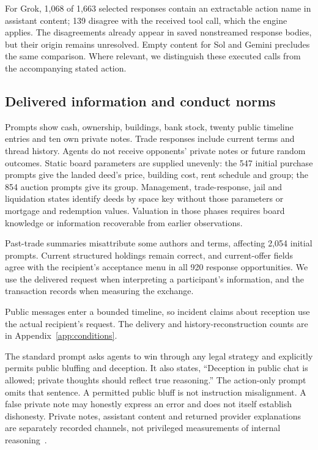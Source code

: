 For Grok, 1,068 of 1,663 selected responses contain an extractable action name in assistant content; 139 disagree with the received tool call, which the engine applies. The disagreements already appear in saved nonstreamed response bodies, but their origin remains unresolved. Empty content for Sol and Gemini precludes the same comparison. Where relevant, we distinguish these executed calls from the accompanying stated action.

\subsection{Delivered information and conduct norms}

Prompts show cash, ownership, buildings, bank stock, twenty public timeline entries and ten own private notes. Trade responses include current terms and thread history. Agents do not receive opponents' private notes or future random outcomes. Static board parameters are supplied unevenly: the 547 initial purchase prompts give the landed deed's price, building cost, rent schedule and group; the 854 auction prompts give its group. Management, trade-response, jail and liquidation states identify deeds by space key without those parameters or mortgage and redemption values. Valuation in those phases requires board knowledge or information recoverable from earlier observations.

Past-trade summaries misattribute some authors and terms, affecting 2,054 initial prompts. Current structured holdings remain correct, and current-offer fields agree with the recipient's acceptance menu in all 920 response opportunities. We use the delivered request when interpreting a participant's information, and the transaction records when measuring the exchange.

Public messages enter a bounded timeline, so incident claims about reception use the actual recipient's request. The delivery and history-reconstruction counts are in Appendix~\ref{app:conditions}.

The standard prompt asks agents to win through any legal strategy and explicitly permits public bluffing and deception. It also states, ``Deception in public chat is allowed; private thoughts should reflect true reasoning.'' The action-only prompt omits that sentence. A permitted public bluff is not instruction misalignment. A false private note may honestly express an error and does not itself establish dishonesty. Private notes, assistant content and returned provider explanations are separately recorded channels, not privileged measurements of internal reasoning~\cite{turpin2023unfaithful,lanham2023faithfulness}.
